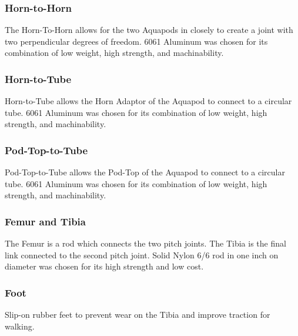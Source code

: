 \subsubsection{Horn-to-Horn}
The Horn-To-Horn allows for the two Aquapods in closely to create a joint with two perpendicular degrees of freedom.
6061 Aluminum was chosen for its combination of low weight, high strength, and machinability.

\subsubsection{Horn-to-Tube}
Horn-to-Tube allows the Horn Adaptor of the Aquapod to connect to a circular tube.
6061 Aluminum was chosen for its combination of low weight, high strength, and machinability.

\subsubsection{Pod-Top-to-Tube}
Pod-Top-to-Tube allows the Pod-Top of the Aquapod to connect to a circular tube.  
6061 Aluminum was chosen for its combination of low weight, high strength, and machinability.

\subsubsection{Femur and Tibia}
The Femur is a rod which connects the two pitch joints. The Tibia is the final link connected to the second pitch joint. Solid Nylon 6/6 rod in one inch on diameter was chosen for its high strength and low cost.

\subsubsection{Foot}
Slip-on rubber feet to prevent wear on the Tibia and improve traction for walking. 

